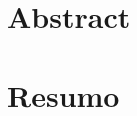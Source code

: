 \begingroup
\let\clearpage\relax

\chapter*{Abstract}
\thispagestyle{empty}

\todo{}

\chapter*{Resumo}
\thispagestyle{empty}

\todo{}

\endgroup